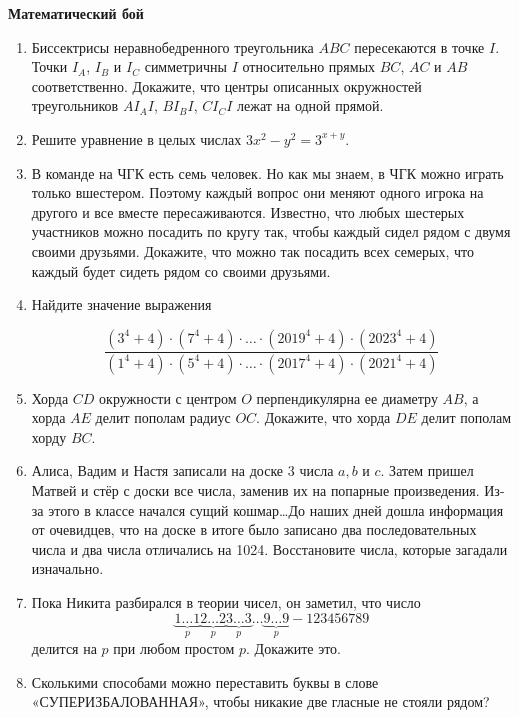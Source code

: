 \documentclass{article}
\begin{document}
    \large


    \begin{center}
        \textbf{Математический бой }
    \end{center}

    \begin{enumerate}[label*=\arabic{enumi}.]

        \item Биссектрисы неравнобедренного треугольника $ABC$ пересекаются в точке $I$.
        Точки $I_A$, $I_B$ и $I_C$ симметричны $I$ относительно прямых $BC$, $AC$ и $AB$ соответственно.
        Докажите, что центры описанных окружностей треугольников $AI_{A}I$, $BI_{B}I$, $CI_{C}I$ лежат на одной прямой.

        \item Решите уравнение в целых числах $3x^2 - y^2 = 3^{x+y}.$


        \item В команде на ЧГК есть семь человек.
        Но как мы знаем, в ЧГК можно играть только вшестером.
        Поэтому каждый вопрос они меняют одного игрока на другого и все вместе пересаживаются.
        Известно, что любых шестерых участников можно посадить по кругу так, чтобы каждый сидел рядом с двумя своими друзьями.
        Докажите, что можно так посадить всех семерых, что каждый будет сидеть рядом со своими друзьями.

        \item Найдите значение выражения

        \[\frac{(3^4+4)\cdot(7^4+4)\cdot\dotsc\cdot(2019^4+4)\cdot(2023^4+4)}{(1^4+4)\cdot(5^4+4)\cdot\dotsc\cdot(2017^4+4)\cdot(2021^4+4)}\]

        \item Хорда $CD$ окружности с центром $O$ перпендикулярна ее диаметру $AB$, а хорда $AE$ делит пополам радиус $OC$.
        Докажите, что хорда $DE$ делит пополам хорду $BC.$

        \item Алиса, Вадим и Настя записали на доске 3 числа $a, b$ и $c$.
        Затем пришел Матвей и стёр с доски все числа, заменив их на попарные произведения.
        Из-за этого в классе начался сущий кошмар\ldots До наших дней дошла информация от очевидцев, что на доске в итоге было записано два последовательных числа и два числа отличались на 1024.
        Восстановите числа, которые загадали изначально.

        \item Пока Никита разбирался в теории чисел, он заметил, что число \[\underbrace{1\dotsc1}_{p}\underbrace{2\dotsc2}_{p}\underbrace{3\dotsc3}_{p}\dotsc \underbrace{9\dotsc9}_{p} - 123456789\] делится на $p$ при любом простом $p$.
        Докажите это.

        \item Сколькими способами можно переставить буквы в слове «СУПЕРИЗБАЛОВАННАЯ», чтобы никакие две гласные не стояли рядом?

    \end{enumerate}
\end{document}
